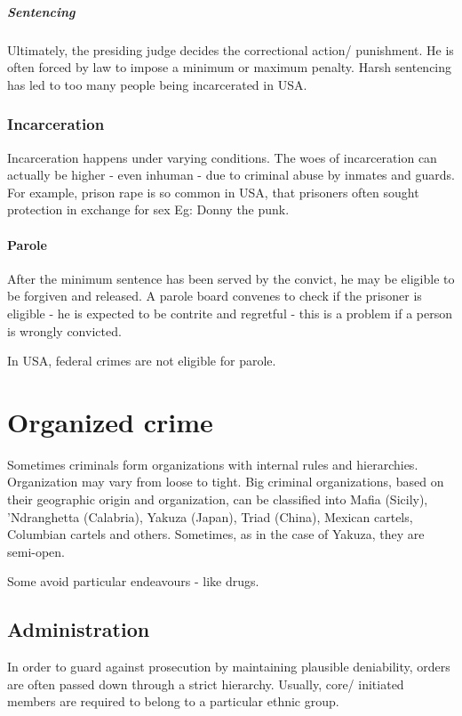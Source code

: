 \documentclass[oneside, article]{memoir}
\begin{document}
\paragraph{Sentencing}
Ultimately, the presiding judge decides the correctional action/ punishment. He is often forced by law to impose a minimum or maximum penalty. Harsh sentencing has led to too many people being incarcerated in USA.

\subsection{Incarceration}
Incarceration happens under varying conditions. The woes of incarceration can actually be higher - even inhuman - due to criminal abuse by inmates and guards. For example, prison rape is so common in USA, that prisoners often sought protection in exchange for sex Eg: Donny the punk.

\subsubsection{Parole}
After the minimum sentence has been served by the convict, he may be eligible to be forgiven and released. A parole board convenes to check if the prisoner is eligible - he is expected to be contrite and regretful - this is a problem if a person is wrongly convicted.

In USA, federal crimes are not eligible for parole.

\chapter{Organized crime}
Sometimes criminals form organizations with internal rules and hierarchies. Organization may vary from loose to tight. Big criminal organizations, based on their geographic origin and organization, can be classified into Mafia (Sicily), 'Ndranghetta (Calabria), Yakuza (Japan), Triad (China), Mexican cartels, Columbian cartels and others. Sometimes, as in the case of Yakuza, they are semi-open.

Some avoid particular endeavours - like drugs.

\section{Administration}
In order to guard against prosecution by maintaining plausible deniability, orders are often passed down through a strict hierarchy. Usually, core/ initiated members are required to belong to a particular ethnic group.
\end{document}
